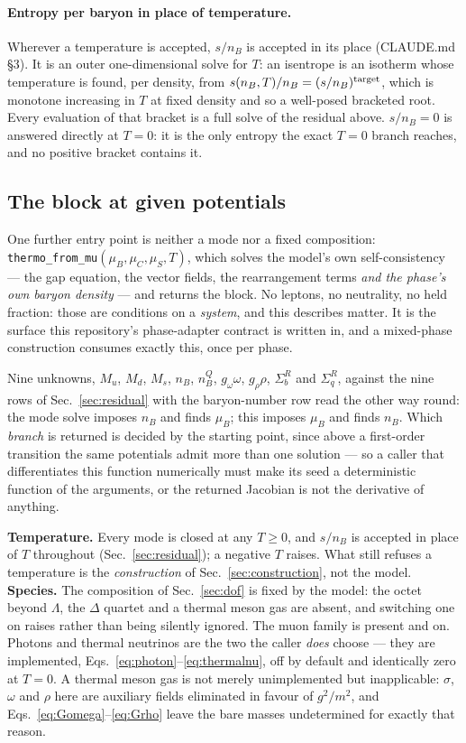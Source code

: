 \documentclass[aps,prc,onecolumn,superscriptaddress,nofootinbib,10pt]{revtex4-2}
\newcommand{\nB}{n_B}
\newcommand{\muB}{\mu_B}
\newcommand{\muC}{\mu_C}
\newcommand{\muS}{\mu_S}
\newcommand{\SR}{\Sigma^{R}}
\begin{document}
\paragraph{Entropy per baryon in place of temperature.}
Wherever a temperature is accepted, $s/\nB$ is accepted in its place
(CLAUDE.md \S3). It is an outer one-dimensional solve for $T$: an isentrope is
an isotherm whose temperature is found, per density, from
$s(\nB, T)/\nB = (s/\nB)^{\rm target}$, which is monotone increasing in $T$
at fixed density and so a well-posed bracketed root. Every evaluation of that
bracket is a full solve of the residual above. $s/\nB = 0$ is answered
directly at $T = 0$: it is the only entropy the exact $T = 0$ branch reaches,
and no positive bracket contains it.

\subsection{The block at given potentials}
\label{sec:frommu}
\label{sec:fromMu}

One further entry point is neither a mode nor a fixed composition:
\texttt{thermo\_from\_mu}$(\muB, \muC, \muS, T)$, which solves the model's own
self-consistency --- the gap equation, the vector fields, the rearrangement
terms \emph{and the phase's own baryon density} --- and returns the block. No
leptons, no neutrality, no held fraction: those are conditions on a
\emph{system}, and this describes matter. It is the surface this
repository's phase-adapter contract is written in, and a mixed-phase
construction consumes exactly this, once per phase.

Nine unknowns, $M_u$, $M_d$, $M_s$, $\nB$, $\nB^Q$, $g_\omega\omega$,
$g_\rho\rho$, $\SR_b$ and $\SR_q$, against the nine rows of
Sec.~\ref{sec:residual} with the baryon-number row read the other way round:
the mode solve imposes $\nB$ and finds $\muB$; this imposes $\muB$ and finds
$\nB$. Which \emph{branch} is returned is decided by the starting point, since
above a first-order transition the same potentials admit more than one
solution --- so a caller that differentiates this function numerically must
make its seed a deterministic function of the arguments, or the returned
Jacobian is not the derivative of anything.

\medskip
\noindent
\textbf{Temperature.} Every mode is closed at any $T \ge 0$, and $s/\nB$ is
accepted in place of $T$ throughout (Sec.~\ref{sec:residual}); a negative $T$
raises. What still refuses a temperature is the \emph{construction} of
Sec.~\ref{sec:construction}, not the model. \textbf{Species.} The composition
of Sec.~\ref{sec:dof} is fixed by the model: the octet beyond $\Lambda$, the
$\Delta$ quartet and a thermal meson gas are absent, and switching one on
raises rather than being silently ignored. The muon family is present and on.
Photons and thermal neutrinos are the two the caller \emph{does} choose ---
they are implemented, Eqs.~\eqref{eq:photon}--\eqref{eq:thermalnu}, off by
default and identically zero at $T = 0$. A thermal meson gas is not merely unimplemented but
inapplicable: $\sigma$, $\omega$ and $\rho$ here are auxiliary fields
eliminated in favour of $g^2/m^2$, and Eqs.~\eqref{eq:Gomega}--\eqref{eq:Grho}
leave the bare masses undetermined for exactly that reason.
\end{document}
